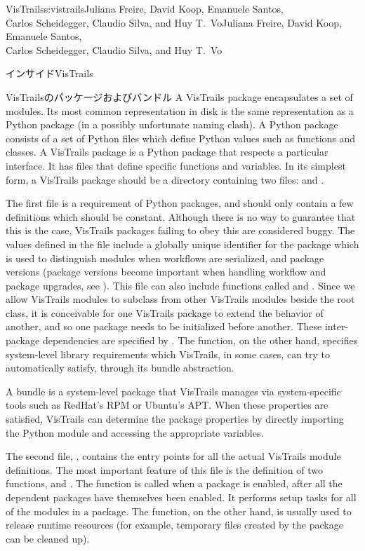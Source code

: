 \begin{aosachaptertoc}{VisTrails}{s:vistrails}{Juliana Freire, David Koop, Emanuele Santos, \\ Carlos Scheidegger, Claudio Silva, and Huy T.\ Vo}{Juliana Freire, David Koop, Emanuele Santos, \\ \hspace*{0.9cm} Carlos Scheidegger, Claudio Silva, and Huy T.\ Vo}
\begin{aosasect1}{インサイドVisTrails}
\begin{aosasect2}{VisTrailsのパッケージおよびバンドル}
A VisTrails package encapsulates a set of modules. Its most
common representation in disk is the same representation as a Python
package (in a possibly unfortunate naming clash). A Python package
consists of a set of Python files which define Python values such as
functions and classes. A VisTrails package is a Python package that
respects a particular interface. It has files that define specific
functions and variables. In its simplest form, a VisTrails package
should be a directory containing two files:  and
.

The first file  is a requirement of Python
packages, and should only contain a few definitions which should be
constant. Although there is no way to guarantee that this is the case,
VisTrails packages failing to obey this are considered buggy. The
values defined in the file include a globally unique identifier for
the package which is used to distinguish modules when workflows are
serialized, and package versions (package versions become important
when handling workflow and package upgrades, see
). This file can also include
functions called  and
. Since we allow VisTrails modules to
subclass from other VisTrails modules beside the root 
class, it is conceivable for one VisTrails package to extend the
behavior of another, and so one package needs to be initialized before
another. These inter-package dependencies are specified by
. The 
function, on the other hand, specifies system-level library
requirements which VisTrails, in some cases, can try to automatically
satisfy, through its bundle abstraction.

A bundle is a system-level package that VisTrails manages via
system-specific tools such as RedHat's RPM or Ubuntu's APT\@.  When
these properties are satisfied, VisTrails can determine the package
properties by directly importing the Python module and accessing the
appropriate variables.

The second file, , contains the entry points for all the
actual VisTrails module definitions. The most important feature of
this file is the definition of two functions,  and
. The  function is called when a
package is enabled, after all the dependent packages have themselves
been enabled. It performs setup tasks for all of the modules in a
package. The  function, on the other hand, is usually
used to release runtime resources (for example, temporary files
created by the package can be cleaned up).


\end{aosasect2}
\end{aosasect1}
\end{aosachaptertoc}
